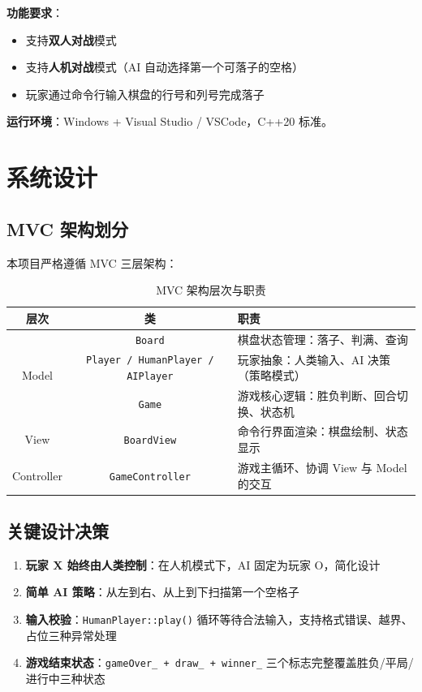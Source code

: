 \documentclass[12pt,a4paper]{ctexart}
\begin{document}
\textbf{功能要求}：
\begin{itemize}[itemsep=3pt]
    \item 支持\textbf{双人对战}模式
    \item 支持\textbf{人机对战}模式（AI 自动选择第一个可落子的空格）
    \item 玩家通过命令行输入棋盘的行号和列号完成落子
\end{itemize}

\textbf{运行环境}：Windows + Visual Studio / VSCode，C++20 标准。

\section{系统设计}

\subsection{MVC 架构划分}

本项目严格遵循 MVC 三层架构：

\begin{table}[H]
\centering
\caption{MVC 架构层次与职责}
\begin{tabular}{|c|c|p{8cm}|}
\hline
\textbf{层次} & \textbf{类} & \textbf{职责} \\
\hline
\multirow{3}{*}{Model} & \texttt{Board} & 棋盘状态管理：落子、判满、查询 \\
\cline{2-3}
                       & \texttt{Player / HumanPlayer / AIPlayer} & 玩家抽象：人类输入、AI 决策（策略模式） \\
\cline{2-3}
                       & \texttt{Game} & 游戏核心逻辑：胜负判断、回合切换、状态机 \\
\hline
View & \texttt{BoardView} & 命令行界面渲染：棋盘绘制、状态显示 \\
\hline
Controller & \texttt{GameController} & 游戏主循环、协调 View 与 Model 的交互 \\
\hline
\end{tabular}
\end{table}

\subsection{关键设计决策}

\begin{enumerate}[itemsep=3pt]
    \item \textbf{玩家 X 始终由人类控制}：在人机模式下，AI 固定为玩家 O，简化设计
    \item \textbf{简单 AI 策略}：从左到右、从上到下扫描第一个空格子
    \item \textbf{输入校验}：\texttt{HumanPlayer::play()} 循环等待合法输入，支持格式错误、越界、占位三种异常处理
    \item \textbf{游戏结束状态}：\texttt{gameOver\_ + draw\_ + winner\_} 三个标志完整覆盖胜负/平局/进行中三种状态
\end{enumerate}
\end{document}
